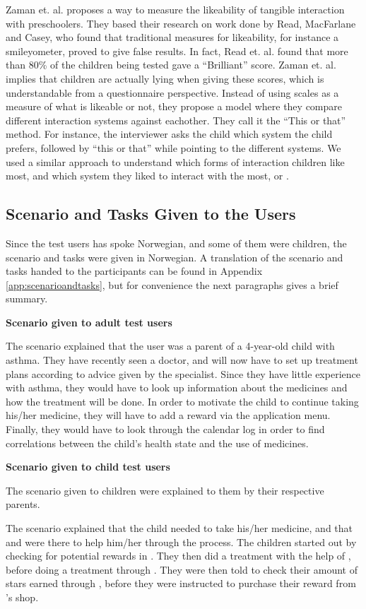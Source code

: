 Zaman et. al. proposes a way to measure the likeability of tangible interaction with preschoolers\cite{zaman2007measure}. They based their research on work done by Read, MacFarlane and Casey\cite{read2002endurability}, who found that traditional measures for likeability, for instance a smileyometer, proved to give false results. In fact, Read et. al. found that more than 80\% of the children being tested gave a ``Brilliant'' score. Zaman et. al. implies that children are actually lying when giving these scores, which is understandable from a questionnaire perspective. Instead of using scales as a measure of what is likeable or not, they propose a model where they compare different interaction systems against eachother. They call it the ``This or that'' method\cite{zaman2007measure}. For instance, the interviewer asks the child which system the child prefers, followed by ``this or that'' while pointing to the different systems. We used a similar approach to understand which forms of interaction children like most, and which system they liked to interact with the most, \app{} or \ab{}.   


\subsection{Scenario and Tasks Given to the Users}
\label{sec:scenarioandtasksgiventotheusers}
Since the test users has spoke Norwegian, and some of them were children, the scenario and tasks were given in Norwegian. A translation of the scenario and tasks handed to the participants can be found in Appendix \ref{app:scenarioandtasks}, but for convenience the next paragraphs gives a brief summary.

\textbf{Scenario given to adult test users}

The scenario explained that the user was a parent of a 4-year-old child with asthma. They have recently seen a doctor, and will now have to set up treatment plans according to advice given by the specialist. Since they have little experience with asthma, they would have to look up information about the medicines and how the treatment will be done. In order to motivate the child to continue taking his/her medicine, they will have to add a reward via the application menu. Finally, they would have to look through the calendar log in order to find correlations between the child's health state and the use of medicines. 


\textbf{Scenario given to child test users}

The scenario given to children were explained to them by their respective parents.

The scenario explained that the child needed to take his/her medicine, and that \app{} and \ab{} were there to help him/her through the process. The children started out by checking for potential rewards in \app{}. They then did a treatment with the help of \ab{}, before doing a treatment through \app{}. They were then told to check their amount of stars earned through \ab{}, before they were instructed to purchase their reward from \app{}'s shop.     